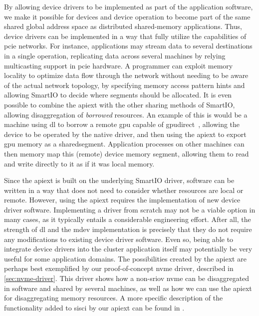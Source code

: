 By allowing device drivers to be implemented as part of the application software, we make it possible for devices and device operation to become part of the same shared global address space as distributed shared-memory applications.
%
Thus, device drivers can be implemented in a way that fully utilize the capabilities of \gls{pcie} networks.
%
For instance, applications may stream data to several destinations in a single operation, replicating data across several machines by relying \gls{multicasting} support in \gls{pcie} hardware.
%
A programmer can exploit memory locality to optimize data flow through the network without needing to be aware of the actual network topology, by specifying memory access pattern hints and allowing SmartIO to decide where \glspl{segment} should be allocated.
%
It is even possible to combine the \gls{apiext} with the other sharing methods of SmartIO, allowing \gls{disaggregation} of \emph{borrowed} resources.
%
An example of this is would be a machine using \gls{dl} to borrow a remote \gls{gpu} capable of \gls{gpudirect}~\cite{url:GPUDirect,url:Rosetti2014}, allowing the device to be operated by the native driver, and then using the \gls{apiext} to export \gls{gpu} memory as a \gls{sharedsegment}.
%
Application processes on other machines can then memory map this (remote) device memory \gls{segment}, allowing them to read and write directly to it as if it was local memory.



Since the \gls{apiext} is built on the underlying SmartIO driver, software can be written in a way that does not need to consider whether resources are local or remote.
%
However, using the \gls{apiext} requires the implementation of new device driver software.
%
Implementing a driver from scratch may not be a viable option in many cases, as it typically entails a considerable engineering effort.
%
After all, the strength of \gls{dl} and the \gls{mdev} implementation is precisely that they do not require any modifications to existing device driver software.
%
Even so, being able to integrate device drivers into the cluster application itself may potentially be very useful for some application domains.
%
The possibilities created by the \gls{apiext} are perhaps best exemplified by our proof-of-concept \gls{nvme} driver, described in \cref{sec:nvme-driver}.
%
This driver shows how a non-\gls{sriov} \gls{nvme} can be \gls{disaggregated} in software and shared by several machines, as well as how we can use the \gls{apiext} for \gls{disaggregating} memory resources.
%
A more specific description of the functionality added to \gls{sisci} by our \gls{apiext} can be found in .



